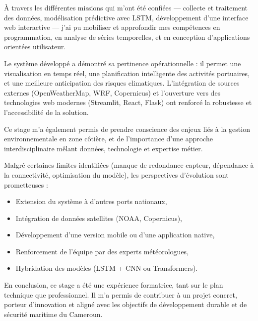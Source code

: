 \documentclass[a4paper,12pt,openany]{report}
\begin{document}
\quad À travers les différentes missions qui m’ont été confiées — collecte et traitement des données, modélisation prédictive avec LSTM, développement d’une interface web interactive — j’ai pu mobiliser et approfondir mes compétences en programmation, en analyse de séries temporelles, et en conception d’applications orientées utilisateur.

\quad Le système développé a démontré sa pertinence opérationnelle : il permet une visualisation en temps réel, une planification intelligente des activités portuaires, et une meilleure anticipation des risques climatiques. L’intégration de sources externes (OpenWeatherMap, WRF, Copernicus) et l’ouverture vers des technologies web modernes (Streamlit, React, Flask) ont renforcé la robustesse et l’accessibilité de la solution.

\quad Ce stage m’a également permis de prendre conscience des enjeux liés à la gestion environnementale en zone côtière, et de l’importance d’une approche interdisciplinaire mêlant données, technologie et expertise métier.

\quad Malgré certaines limites identifiées (manque de redondance capteur, dépendance à la connectivité, optimisation du modèle), les perspectives d’évolution sont prometteuses :
\begin{itemize}
	\item Extension du système à d’autres ports nationaux,
	\item Intégration de données satellites (NOAA, Copernicus),
	\item Développement d’une version mobile ou d’une application native,
	\item Renforcement de l’équipe par des experts météorologues,
	\item Hybridation des modèles (LSTM + CNN ou Transformers).
\end{itemize}

\quad En conclusion, ce stage a été une expérience formatrice, tant sur le plan technique que professionnel. Il m’a permis de contribuer à un projet concret, porteur d’innovation et aligné avec les objectifs de développement durable et de sécurité maritime du Cameroun.

\newpage
\end{document}
